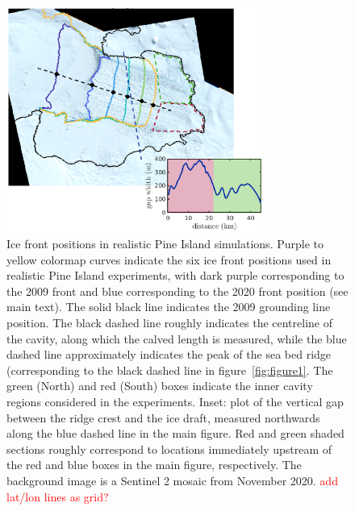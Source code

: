 \documentclass[draft]{agujournal2019}
\newcommand{\red}[1]{\textcolor{red}{#1}}
\begin{document}
\begin{figure}
    \centering
    \includegraphics[width = 0.75\textwidth]{../make_figures/plots/figure10.eps}
    \caption{Ice front positions in realistic Pine Island simulations. Purple to yellow colormap curves indicate the six ice front positions used in realistic Pine Island experiments, with dark purple corresponding to the 2009 front and blue corresponding to the 2020 front position (see main text). The solid black line indicates the 2009 grounding line position. The black dashed line roughly indicates the centreline of the cavity, along which the calved length is measured, while the blue dashed line approximately indicates  the peak of the sea bed ridge (corresponding to the black dashed line in figure~\ref{fig:figure1}. The green (North) and red (South) boxes indicate the inner cavity regions considered in the experiments. Inset: plot of the vertical gap between the ridge crest and the ice draft, measured northwards along the blue dashed line in the main figure. Red and green shaded sections roughly correspond to locations immediately upstream of the red and blue boxes in the main figure, respectively. The background image is a Sentinel 2 mosaic from November 2020. \red{add lat/lon lines as grid?}}
    \label{fig:figure10}
\end{figure}
\end{document}
